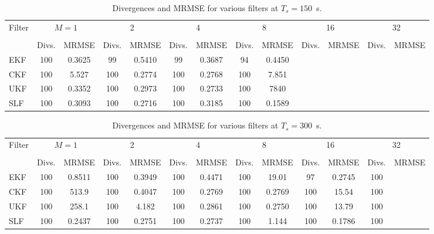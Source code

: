 \documentclass[../zhang_thesis.tex]{subfiles}
\begin{document}
\begin{sidewaystable}
\caption{Divergences and MRMSE for various filters at $T_s=150$~s.}
\centering
\begin{tabular}{l*{12}{c}}
\toprule
Filter & \multicolumn{2}{c}{$M=1$} & \multicolumn{2}{c}{2} & \multicolumn{2}{c}{4} & \multicolumn{2}{c}{8} & \multicolumn{2}{c}{16} & \multicolumn{2}{c}{32} \\
\cmidrule(r){2-3} \cmidrule(lr){4-5} \cmidrule(lr){6-7} \cmidrule(lr){8-9} \cmidrule(lr){10-11} \cmidrule(lr){12-13} \\
& Divs. & MRMSE & Divs. & MRMSE & Divs. & MRMSE & Divs. & MRMSE & Divs. & MRMSE & Divs. & MRMSE \\
\midrule
EKF & 100 & 0.3625 &  99 & 0.5410 &  99 & 0.3687 &  94 & 0.4450 \\
CKF & 100 & 5.527  & 100 & 0.2774 & 100 & 0.2768 & 100 & 7.851 \\
UKF & 100 & 0.3352 & 100 & 0.2973 & 100 & 0.2733 & 100 & 7840 \\
SLF & 100 & 0.3093 & 100 & 0.2716 & 100 & 0.3185 & 100 & 0.1589 \\
\bottomrule
\end{tabular}
\end{sidewaystable}

\begin{sidewaystable}
\caption{Divergences and MRMSE for various filters at $T_s=300$~s.}
\centering
\begin{tabular}{l*{12}{c}}
\toprule
Filter & \multicolumn{2}{c}{$M=1$} & \multicolumn{2}{c}{2} & \multicolumn{2}{c}{4} & \multicolumn{2}{c}{8} & \multicolumn{2}{c}{16} & \multicolumn{2}{c}{32} \\
\cmidrule(r){2-3} \cmidrule(lr){4-5} \cmidrule(lr){6-7} \cmidrule(lr){8-9} \cmidrule(lr){10-11} \cmidrule(lr){12-13} \\
& Divs. & MRMSE & Divs. & MRMSE & Divs. & MRMSE & Divs. & MRMSE & Divs. & MRMSE & Divs. & MRMSE \\
\midrule
EKF & 100 & 0.8511 & 100 & 0.3949 & 100 & 0.4471 & 100 & 19.01  &  97 & 0.2745 & 100 &  \\
CKF & 100 & 513.9  & 100 & 0.4047 & 100 & 0.2769 & 100 & 0.2769 & 100 & 15.54  & 100 &  \\
UKF & 100 & 258.1  & 100 & 4.182  & 100 & 0.2861 & 100 & 0.2750 & 100 & 13.79  & 100 &  \\
SLF & 100 & 0.2437 & 100 & 0.2751 & 100 & 0.2737 & 100 & 1.144  & 100 & 0.1786 & 100 &  \\
\bottomrule
\end{tabular}
\end{sidewaystable}
\end{document}
